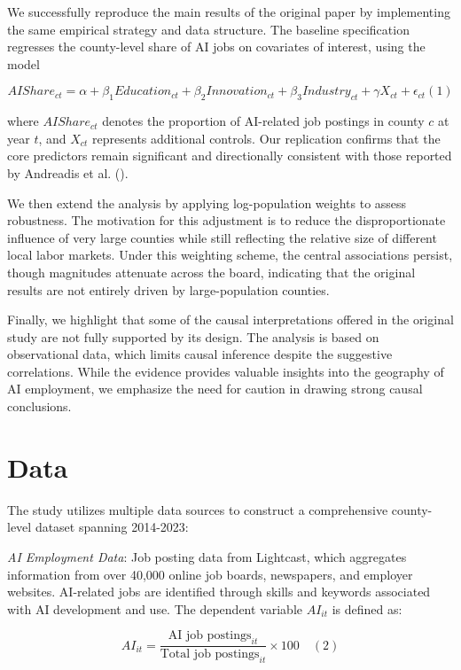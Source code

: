 \documentclass[
]{article}
\begin{document}
We successfully reproduce the main results of the original paper by
implementing the same empirical strategy and data structure. The
baseline specification regresses the county-level share of AI jobs on
covariates of interest, using the model

\[
AIShare_{ct} = \alpha + \beta_1 Education_{ct} + \beta_2 Innovation_{ct} + \beta_3 Industry_{ct} + \gamma X_{ct} + \epsilon_{ct} (1)
\]

where \(AIShare_{ct}\) denotes the proportion of AI-related job postings
in county \(c\) at year \(t\), and \(X_{ct}\) represents additional
controls. Our replication confirms that the core predictors remain
significant and directionally consistent with those reported by
Andreadis et al. ().

We then extend the analysis by applying log-population weights to assess
robustness. The motivation for this adjustment is to reduce the
disproportionate influence of very large counties while still reflecting
the relative size of different local labor markets. Under this weighting
scheme, the central associations persist, though magnitudes attenuate
across the board, indicating that the original results are not entirely
driven by large-population counties.

Finally, we highlight that some of the causal interpretations offered in
the original study are not fully supported by its design. The analysis
is based on observational data, which limits causal inference despite
the suggestive correlations. While the evidence provides valuable
insights into the geography of AI employment, we emphasize the need for
caution in drawing strong causal conclusions.

\section{Data}\label{data}

The study utilizes multiple data sources to construct a comprehensive
county-level dataset spanning 2014-2023:

\emph{AI Employment Data}: Job posting data from Lightcast, which
aggregates information from over 40,000 online job boards, newspapers,
and employer websites. AI-related jobs are identified through skills and
keywords associated with AI development and use. The dependent variable
\(AI_{it}\) is defined as:

\[AI_{it} = \frac{\text{AI job postings}_{it}}{\text{Total job postings}_{it}} \times 100 \quad                                                  (2)\]
\end{document}
